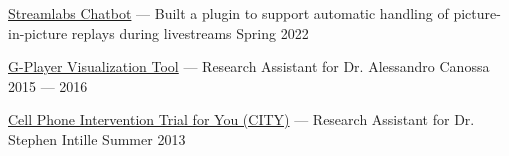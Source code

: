 
\href{https://github.com/iambroadband/auto-instant-replay}{Streamlabs Chatbot} --- Built a plugin to support automatic handling of picture-in-picture replays during livestreams    \hfill Spring 2022

\href{https://github.com/spacial-player-data-visualization/g-player-visualization}{G-Player Visualization Tool} --- Research Assistant for Dr. Alessandro Canossa   \hfill 2015 --- 2016

\href{https://www.mhealthgroup.org/projects.html}{Cell Phone Intervention Trial for You (CITY)} --- Research Assistant for Dr. Stephen Intille  \hfill Summer 2013
